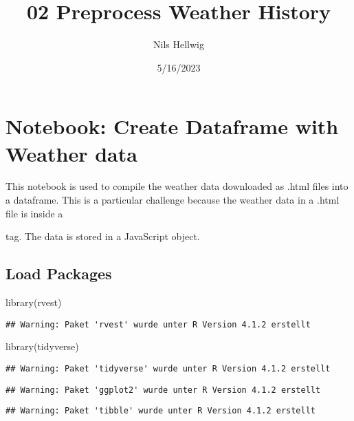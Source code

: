 \documentclass[
]{article}
\title{02 Preprocess Weather History}
\author{Nils Hellwig}
\date{5/16/2023}
\newenvironment{Shaded}{\begin{snugshade}}{\end{snugshade}}
\newcommand{\FunctionTok}[1]{\textcolor[rgb]{0.00,0.00,0.00}{#1}}
\newcommand{\NormalTok}[1]{#1}
\begin{document}
\maketitle

\hypertarget{notebook-create-dataframe-with-weather-data}{%
\section{Notebook: Create Dataframe with Weather
data}\label{notebook-create-dataframe-with-weather-data}}

This notebook is used to compile the weather data downloaded as .html
files into a dataframe. This is a particular challenge because the
weather data in a .html file is inside a

tag. The data is stored in a JavaScript object.

\hypertarget{load-packages}{%
\subsection{Load Packages}\label{load-packages}}

\begin{Shaded}
\begin{Highlighting}[]
\FunctionTok{library}\NormalTok{(rvest)}
\end{Highlighting}
\end{Shaded}

\begin{verbatim}
## Warning: Paket 'rvest' wurde unter R Version 4.1.2 erstellt
\end{verbatim}

\begin{Shaded}
\begin{Highlighting}[]
\FunctionTok{library}\NormalTok{(tidyverse)}
\end{Highlighting}
\end{Shaded}

\begin{verbatim}
## Warning: Paket 'tidyverse' wurde unter R Version 4.1.2 erstellt
\end{verbatim}

\begin{verbatim}
## Warning: Paket 'ggplot2' wurde unter R Version 4.1.2 erstellt
\end{verbatim}

\begin{verbatim}
## Warning: Paket 'tibble' wurde unter R Version 4.1.2 erstellt
\end{verbatim}
\end{document}
